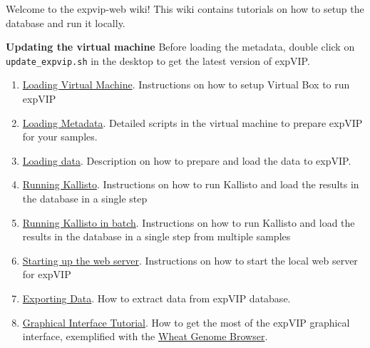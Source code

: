 Welcome to the expvip-web wiki! This wiki contains tutorials on how to
setup the database and run it locally.

\textbf{Updating the virtual machine} Before loading the metadata,
double click on \lstinline!update_expvip.sh! in the desktop to get the
latest version of expVIP.

\begin{enumerate}
\def\labelenumi{\arabic{enumi}.}
\itemsep1pt\parskip0pt
\item
  \href{LoadingVM}{Loading Virtual Machine}. Instructions on how to
  setup Virtual Box to run expVIP
\item
  \href{LoadingMetadata}{Loading Metadata}. Detailed scripts in the
  virtual machine to prepare expVIP for your samples.
\item
  \href{LoadingData}{Loading data}. Description on how to prepare and
  load the data to expVIP.
\item
  \href{RunKallisto}{Running Kallisto}. Instructions on how to run
  Kallisto and load the results in the database in a single step
\item
  \href{RunKallistoBatch}{Running Kallisto in batch}. Instructions on
  how to run Kallisto and load the results in the database in a single
  step from multiple samples
\item
  \href{StartWebServer}{Starting up the web server}. Instructions on how
  to start the local web server for expVIP
\item
  \href{ExportData}{Exporting Data}. How to extract data from expVIP
  database.
\item
  \href{https://github.com/homonecloco/expvip-web/wiki/Tutorial-expVIP-Graphical-Interface-(Wheat-Expression-Browser-example)}{Graphical
  Interface Tutorial}. How to get the most of the expVIP graphical
  interface, exemplified with the
  \href{http://www.wheat-expression.com/}{Wheat Genome Browser}.
\end{enumerate}
